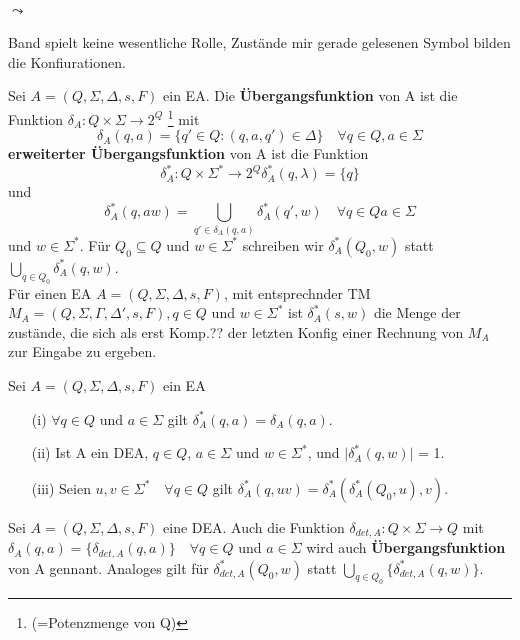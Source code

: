         \paragraph*{\(\leadsto\)}
            Band spielt keine wesentliche Rolle, Zustände mir gerade gelesenen Symbol bilden die Konfiurationen.

    Sei \(A = (Q, \Sigma, \Delta, s, F)\) ein EA. Die \textbf{Übergangsfunktion} von A ist die Funktion \(\delta_{A} : Q \times \Sigma \rightarrow 2^{Q}\) \footnote{(=Potenzmenge von Q)} mit 
    \[
        \delta_{A}(q,a) = \{q'\in Q : (q, a, q')\in \Delta\} \quad \forall q \in Q, a \in \Sigma
    \] 
    \textbf{erweiterter Übergangsfunktion} von A ist die Funktion 
    \[
        \delta_{A}^{*} : Q \times \Sigma^{*} \rightarrow 2^{Q} \delta_{A}^{*}(q, \lambda) = \{q\}
    \] 
    und 
    \[
        \delta_{A}^{*}(q, aw) = \bigcup \limits_{q'\in \delta_{A}(q,a)} \delta_{A}^{*}(q', w) \quad \forall q\in Q a\in \Sigma
    \]
    und 
    \(w\in \Sigma^{*}\). Für \(Q_{0} \subseteq Q\) und \(w \in \Sigma^{*}\) schreiben wir \(\delta_{A}^{*} (Q_{0}, w)\) statt \(\bigcup \limits_{q \in Q_{0}} \delta_{A}^{*}(q,w)\).
    \\ Für einen EA \(A = (Q, \Sigma, \Delta, s, F)\), mit entsprechnder TM \(M_{A} = (Q, \Sigma, \Gamma, \Delta', s, F), q \in Q\) und \(w \in \Sigma^{*}\) ist \(\delta_{A}^{*}(s,w)\) die Menge der zustände, die sich als erst Komp.?? der letzten Konfig einer Rechnung von \(M_{A}\) zur Eingabe zu ergeben.

Sei \(A = (Q, \Sigma, \Delta, s, F)\) ein EA
\begin{itemize}
    \item [(i)] \( \forall q \in Q\) und \(a\in \Sigma\) gilt \(\delta_{A}^{*}(q,a) = \delta_{A}(q, a)\).
    \item [(ii)] Ist A ein DEA, \(q \in Q\), \(a \in \Sigma\) und \(w \in \Sigma^{*}\), und \(\lvert \delta_{A}^{*}(q,w) \rvert\) = 1.
    \item[(iii)] Seien \(u,v \in \Sigma^{*} \quad \forall q \in Q\) gilt \(\delta_{A}^{*}(q, uv) = \delta_{A}^{*}(\delta_{A}^{*}(Q_{0}, u), v)\).
\end{itemize}

Sei \(A = (Q, \Sigma,  \Delta, s, F)\) eine DEA. Auch die Funktion \(\delta_{det, A}: Q \times \Sigma \rightarrow Q\) mit \(\delta_{A}(q,a) = \{\delta_{det, A}(q, a)\} \quad \forall q \in Q\) und \(a \in \Sigma\) wird auch \textbf{Übergangsfunktion} von A gennant. Analoges gilt für \(\delta_{det, A}^{*}(Q_{0}, w)\) statt \(\bigcup \limits_{q \in Q_{0}}\{\delta_{det, A}^{*}(q, w)\}\).

